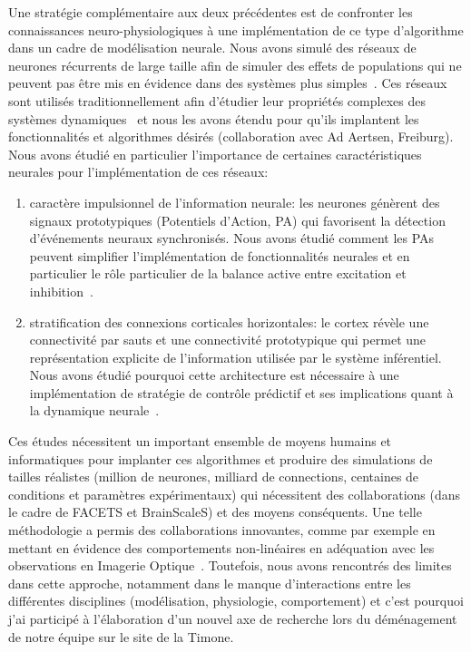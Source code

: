 \documentclass[11pt,french,a4paper,oneside]{article}%
\begin{document}
Une stratégie complémentaire aux deux précédentes est de confronter les connaissances neuro-physiologiques à une implémentation de ce type d'algorithme dans un cadre de modélisation neurale. Nous avons simulé des réseaux de neurones récurrents de large taille afin de simuler des effets de populations qui ne peuvent pas être mis en évidence dans des systèmes plus simples~\citep{Kremkow05}. Ces réseaux sont utilisés traditionnellement afin d'étudier leur propriétés complexes des systèmes dynamiques~\citep{Kremkow07} et nous les avons étendu pour qu'ils implantent les fonctionnalités et algorithmes désirés (collaboration avec Ad Aertsen, Freiburg). Nous avons étudié en particulier l'importance de certaines caractéristiques neurales pour l'implémentation de ces réseaux:
\begin{enumerate}
\item caractère impulsionnel de l'information neurale: les neurones génèrent des signaux prototypiques (Potentiels d'Action, PA) qui favorisent la détection d'événements neuraux synchronisés. Nous avons étudié comment les PAs peuvent simplifier l'implémentation de fonctionnalités neurales et en particulier le rôle particulier de la balance active entre excitation et inhibition~\citep{Kremkow07cns,Kremkow08neurocomp,Kremkow08sfn,Voges08,Kremkow09gns,Kremkow10jcns,Kremkow16}.
\item stratification des connexions corticales horizontales: le cortex révèle une connectivité par sauts et une connectivité prototypique qui permet une représentation explicite de l'information utilisée par le système inférentiel. Nous avons étudié pourquoi cette architecture est nécessaire à une implémentation de stratégie de contrôle prédictif et ses implications quant à la dynamique neurale~\citep{Voges08,Voges08neurocomp,Perrinet09cosyne,Voges09gns,Voges09cosyne,Voges10,Voges12}.
\end{enumerate}

Ces études nécessitent un important ensemble de moyens humains et informatiques pour implanter ces algorithmes et produire des simulations de tailles réalistes (million de neurones, milliard de connections, centaines de conditions et paramètres expérimentaux) qui nécessitent des collaborations (dans le cadre de FACETS et BrainScaleS) et des moyens conséquents. Une telle méthodologie a permis des collaborations innovantes, comme par exemple en mettant en évidence des comportements non-linéaires en adéquation avec les observations en Imagerie Optique~\citep{Perrinet09vss}. Toutefois, nous avons rencontrés des limites dans cette approche, notamment dans le manque d'interactions entre les différentes disciplines (modélisation, physiologie, comportement) et c'est pourquoi j'ai participé à l'élaboration d'un nouvel axe de recherche lors du déménagement de notre équipe sur le site de la Timone. %
\end{document}
